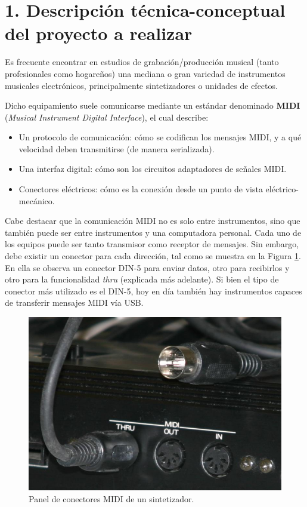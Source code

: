 \documentclass[
11pt, %
]{charter}
\begin{document}
\section{1. Descripción técnica-conceptual del proyecto a realizar}
\label{sec:descripcion}
Es frecuente encontrar en estudios de grabación/producción musical (tanto profesionales como hogareños) una mediana o gran variedad de instrumentos musicales electrónicos, principalmente sintetizadores o unidades de efectos.

Dicho equipamiento suele comunicarse mediante un estándar denominado \textbf{MIDI} (\emph{Musical Instrument Digital Interface}), el cual describe:
\begin{itemize}
	\item Un protocolo de comunicación: cómo se codifican los mensajes MIDI, y a qué velocidad deben transmitirse (de manera serializada).
	\item Una interfaz digital: cómo son los circuitos adaptadores de señales MIDI.
	\item Conectores eléctricos: cómo es la conexión desde un punto de vista eléctrico-mecánico.
\end{itemize}

Cabe destacar que la comunicación MIDI no es solo entre instrumentos, sino que también puede ser entre instrumentos y una computadora personal. Cada uno de los equipos puede ser tanto transmisor como receptor de mensajes. Sin embargo, debe existir un conector para cada dirección, tal como se muestra en la Figura \ref{fig:01-midi-connector}. En ella se observa un conector DIN-5 para enviar datos, otro para recibirlos y otro para la funcionalidad \emph{thru} (explicada más adelante). Si bien el tipo de conector más utilizado es el DIN-5, hoy en día también hay instrumentos capaces de transferir mensajes MIDI vía USB.

\begin{figure}[htpb]
	\centering 
	\includegraphics[width=.4\textwidth]{./Figuras/01-midi-connector.jpg}
	\caption{Panel de conectores MIDI de un sintetizador.}
	\label{fig:01-midi-connector}
\end{figure}
\end{document}
